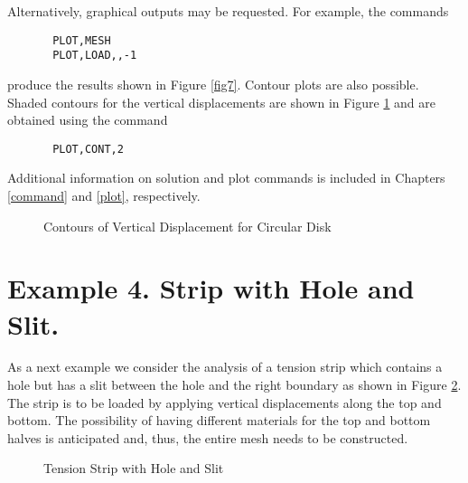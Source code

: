 Alternatively, graphical outputs may be requested.  For example, the
commands
\begin{verbatim}
       PLOT,MESH
       PLOT,LOAD,,-1
\end{verbatim}
produce the results shown in Figure \ref{fig7}.
Contour plots are also possible.
Shaded contours for the vertical displacements are shown in Figure \ref{fig8}
and are obtained using the command
\begin{verbatim}
       PLOT,CONT,2
\end{verbatim}
Additional information on solution and plot commands is included in
Chapters \ref{command} and \ref{plot}, respectively.

\begin{figure}
\epsfxsize=4.2in
\centerline {\hfil {} \hfil}
\caption{Contours of Vertical Displacement for Circular Disk}
\label{fig8}
\end{figure}

\section{Example 4. Strip with Hole and Slit.}
\label{ex4}

As a next example we consider the analysis of a tension strip which
contains a hole but has a slit between the hole and the right boundary
as shown in Figure \ref{fig9}.  The strip is to be loaded by applying vertical
displacements along the top and bottom.  The possibility of having
different materials for the top and bottom halves is anticipated and,
thus, the entire mesh needs to be constructed.

\begin{figure}[ht!]
\epsfxsize=1.6in
\centerline {\hfil {} \hfil}
\caption{Tension Strip with Hole and Slit}
\label{fig9}
\end{figure}

